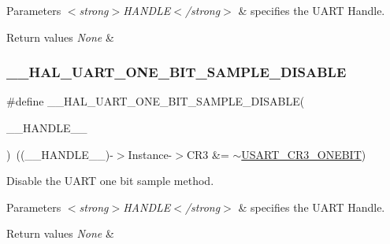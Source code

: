 \begin{DoxyParams}{Parameters}
{\em $<$strong$>$\+H\+A\+N\+D\+L\+E$<$/strong$>$} & specifies the U\+A\+RT Handle. \\
\hline
\end{DoxyParams}

\begin{DoxyRetVals}{Return values}
{\em None} & \\
\hline
\end{DoxyRetVals}
\mbox{\label{group___u_a_r_t___exported___macros_ga2dbd7e6592e8c5999f817b69f0fd24bb}} 
\subsubsection{\texorpdfstring{\_\_HAL\_UART\_ONE\_BIT\_SAMPLE\_DISABLE}{\_\_HAL\_UART\_ONE\_BIT\_SAMPLE\_DISABLE}}
{\footnotesize\ttfamily \#define \+\_\+\+\_\+\+H\+A\+L\+\_\+\+U\+A\+R\+T\+\_\+\+O\+N\+E\+\_\+\+B\+I\+T\+\_\+\+S\+A\+M\+P\+L\+E\+\_\+\+D\+I\+S\+A\+B\+LE(\begin{DoxyParamCaption}\item[{}]{\+\_\+\+\_\+\+H\+A\+N\+D\+L\+E\+\_\+\+\_\+ }\end{DoxyParamCaption})~((\+\_\+\+\_\+\+H\+A\+N\+D\+L\+E\+\_\+\+\_\+)-\/$>$Instance-\/$>$C\+R3 \&= $\sim$\mbox{\hyperlink{group___peripheral___registers___bits___definition_ga9a96fb1a7beab602cbc8cb0393593826}{U\+S\+A\+R\+T\+\_\+\+C\+R3\+\_\+\+O\+N\+E\+B\+IT}})}



Disable the U\+A\+RT one bit sample method. 


\begin{DoxyParams}{Parameters}
{\em $<$strong$>$\+H\+A\+N\+D\+L\+E$<$/strong$>$} & specifies the U\+A\+RT Handle. \\
\hline
\end{DoxyParams}

\begin{DoxyRetVals}{Return values}
{\em None} & \\
\hline
\end{DoxyRetVals}
\mbox{\label{group___u_a_r_t___exported___macros_ga3524747e5896296ab066d786431503ce}} 
